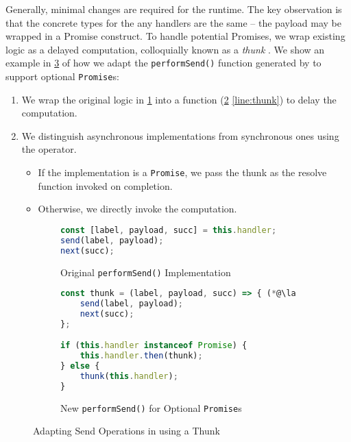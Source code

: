 Generally, minimal changes are required for the runtime.
The key observation is that the concrete types for the any
handlers are the same -- the payload may be wrapped in a Promise
construct.
To handle potential Promises, we wrap existing logic
as a delayed computation, colloquially known as a \textit{thunk}
\cite{Thunk}.
We show an example in \cref{fig:thunk} of how we
adapt the \texttt{performSend()} function generated by
 to support optional \texttt{Promise}s:

\begin{enumerate}
\item
We wrap the original logic in \cref{subfig:originalthunk} into a
function (\cref{subfig:newthunk} \cref{line:thunk})
to delay the computation.

\item
We distinguish asynchronous implementations
from synchronous ones using the  operator.

\begin{itemize}
\item
If the implementation is a \texttt{Promise}, we pass
the thunk as the resolve function invoked on completion.

\item
Otherwise, we directly invoke the computation.
\end{itemize}

\end{enumerate}

\begin{figure}[!h]
\begin{subfigure}{\textwidth}
\begin{lstlisting}[language=javascript,tabsize=2]
const [label, payload, succ] = this.handler;
send(label, payload);
next(succ);
\end{lstlisting}
\caption{Original \texttt{performSend()} Implementation}
\label{subfig:originalthunk}
\end{subfigure}
\hfill
\begin{subfigure}{\textwidth}
\begin{lstlisting}[language=javascript,tabsize=2]
const thunk = (label, payload, succ) => { (*@\label{line:thunk}@*)
	send(label, payload);
	next(succ);	
};

if (this.handler instanceof Promise) {
	this.handler.then(thunk);
} else {
	thunk(this.handler);
}
\end{lstlisting}
\caption{New \texttt{performSend()} for Optional \texttt{Promise}s}
\label{subfig:newthunk}
\end{subfigure}
\caption{Adapting Send Operations in 
using a Thunk}
\label{fig:thunk}
\end{figure}

